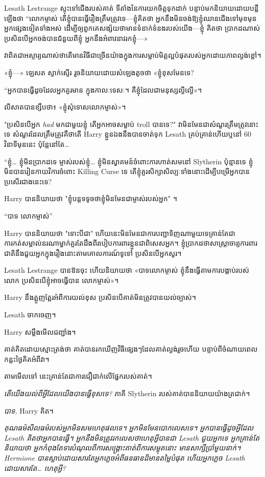 Lesath Lestrange ស្ទុះទៅជើងរបស់គាត់ ទីតាំងនៃការយកចិត្តទុកដាក់ បន្ទាប់មកនិយាយដោយបន្លឺឡើងថា “លោកម្ចាស់ តើខ្ញុំបានធ្វើរឿងត្រឹមត្រូវទេ—ខ្ញុំគិតថា អ្នកនឹងមិនចង់ឱ្យខ្ញុំឈានជើងទៅមុខមុនអ្នកផ្សេងទៀតទាំងអស់ ដើម្បីឲ្យពួកគេសង្ស័យថាមានទំនាក់ទំនងរបស់យើង—ខ្ញុំ គិតថា ប្រាកដណាស់ ប្រសិនបើអ្នកចង់បានជំនួយពីខ្ញុំ អ្នកនឹងអំពាវនាវរកខ្ញុំ—»

វាពិតជាអស្ចារ្យណាស់ថាតើមានវិធីជាច្រើនយ៉ាងក្នុងការសម្លាប់មិត្តល្អបំផុតរបស់អ្នកដោយភាពល្ងង់ខ្លៅ។

«ខ្ញុំ—» ឡេសត ស្ទាក់ស្ទើរ រួចនិយាយដោយសំឡេងតូចថា «ខ្ញុំខុសមែនទេ?

“អ្នក​បាន​ធ្វើ​ដូច​ដែល​អ្នក​គួរ​មាន ក្នុង​កាលៈទេសៈ។ គឺ​ខ្ញុំ​ដែល​ជា​មនុស្ស​ល្ងីល្ងើ»។

លីសាត​បាន​ខ្សឹប​ថា៖ «ខ្ញុំ​សុំទោស​លោក​ម្ចាស់»។

"ប្រសិនបើអ្នក \emph{had} មកជាមួយខ្ញុំ តើអ្នកអាចសម្លាប់ troll បានទេ?" វាមិនមែនជាសំណួរត្រឹមត្រូវនោះទេ សំណួរដែលត្រឹមត្រូវគឺថាតើ Harry ខ្លួនឯងនឹងបានចាត់ទុក Lesath គ្រប់គ្រាន់ហើយឬនៅ 60 វិនាទីមុននេះ ប៉ុន្តែនៅតែ…

“ខ្ញុំ… ខ្ញុំមិនប្រាកដទេ ម្ចាស់របស់ខ្ញុំ… ខ្ញុំមិនស្វាគមន៍ចំពោះការហាត់សមនៅ Slytherin ប៉ុន្មានទេ ខ្ញុំមិនបានរៀនកាយវិការចំពោះ Killing Curse ទេ តើខ្ញុំគួរសិក្សាសិល្បៈទាំងនោះដើម្បីបម្រើអ្នកបានប្រសើរជាងនេះទេ?

Harry បាននិយាយថា "ខ្ញុំបន្តទទូចថាខ្ញុំមិនមែនជាម្ចាស់របស់អ្នក" ។

“បាទ លោកម្ចាស់”

Harry បាននិយាយថា "ទោះបីជា" ហើយនេះមិនមែនជាការបញ្ជាទិញណាមួយទេគ្រាន់តែជាការកត់សម្គាល់នរណាម្នាក់គួរតែដឹងពីរបៀបការពារខ្លួនជាពិសេសអ្នក។ ខ្ញុំប្រាកដថាសាស្រ្តាចារ្យការពារជាតិនឹងជួយអ្នកក្នុងរឿងនោះតាមគោលការណ៍ទូទៅ ប្រសិនបើអ្នកសួរ។

Lesath Lestrange បាន​ឱន​ចុះ ហើយ​និយាយ​ថា «បាទ​លោក​ម្ចាស់ ខ្ញុំ​នឹង​ធ្វើ​តាម​ការ​បង្គាប់​របស់​លោក ប្រសិន​បើ​ខ្ញុំ​អាច​ធ្វើ​បាន លោក​ម្ចាស់»។

Harry នឹង​ត្អូញត្អែរ​អំពី​ការ​យល់​ខុស ប្រសិនបើ​គាត់​មិន​ត្រូវ​បាន​យល់​ច្បាស់។

Lesath ចាកចេញ។

Harry សម្លឹងមើលជញ្ជាំង។

គាត់គិតដោយស្មោះត្រង់ថា គាត់បានរកឃើញវិធីផ្សេងៗដែលគាត់ល្ងង់រួចហើយ បន្ទាប់ពីចំណាយពេលកន្លះថ្ងៃគិតអំពីវា។

តាមមើលទៅ នេះគ្រាន់តែជាការជឿជាក់លើផ្នែករបស់គាត់។

\emph{តើយើងយល់ពីអ្វីដែលយើងបានធ្វើខុសទេ?} ភាគី Slytherin របស់គាត់បាននិយាយយ៉ាងត្រជាក់។

\emph{បាទ,} Harry គិត។

\emph{គុណធម៌សីលធម៌របស់អ្នកមិនសមហេតុផលទេ។ អ្នក​មិន​មែន​បោក​លេស​ទេ។ អ្នកបានធ្វើដូចអ្វីដែល Lesath គិតថាអ្នកបានធ្វើ។ អ្នក​នឹង​មិន​ត្រូវ​រក​លេស​ថា​ហេតុ​អ្វី​បាន​ជា Lesath ជួយ​អ្នក​ទេ អ្នក​គ្រាន់​តែ​និយាយ​ថា អ្នក​កំពុង​តែ​ទារ​បំណុល​ពី​ការ​សង្គ្រោះ​គាត់​ពី​ការ​សម្លុត​នោះ មាន​សាក្សី​ប្រាំមួយ​នាក់។ Hermione បានស្លាប់ដោយសារតែអ្នកភ្លេចអំពីធនធានដ៏មានតម្លៃបំផុត ហើយអ្នកភ្លេច Lesath ដោយសារតែ… ហេតុអ្វី?}

